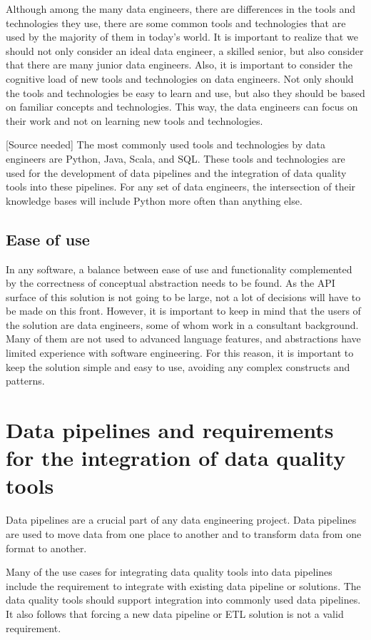 Although among the many data engineers, there are differences in the tools and technologies they use, there are some common tools and technologies that are used by the majority of them in today's world. It is important to realize that we should not only consider an ideal data engineer, a skilled senior, but also consider that there are many junior data engineers. Also, it is important to consider the cognitive load of new tools and technologies on data engineers. Not only should the tools and technologies be easy to learn and use, but also they should be based on familiar concepts and technologies. This way, the data engineers can focus on their work and not on learning new tools and technologies. 

[Source needed] The most commonly used tools and technologies by data engineers are Python, Java, Scala, and SQL. These tools and technologies are used for the development of data pipelines and the integration of data quality tools into these pipelines. For any set of data engineers, the intersection of their knowledge bases will include Python more often than anything else.

\subsection{Ease of use}

In any software, a balance between ease of use and functionality complemented by the correctness of conceptual abstraction needs to be found. As the API surface of this solution is not going to be large, not a lot of decisions will have to be made on this front. However, it is important to keep in mind that the users of the solution are data engineers, some of whom work in a consultant background. Many of them are not used to advanced language features, and abstractions have limited experience with software engineering. For this reason, it is important to keep the solution simple and easy to use, avoiding any complex constructs and patterns.

\section{Data pipelines and requirements for the integration of data quality tools}

Data pipelines are a crucial part of any data engineering project. Data pipelines are used to move data from one place to another and to transform data from one format to another. 

Many of the use cases for integrating data quality tools into data pipelines include the requirement to integrate with existing data pipeline or solutions. The data quality tools should support integration into commonly used data pipelines. It also follows that forcing a new data pipeline or ETL solution is not a valid requirement. 

